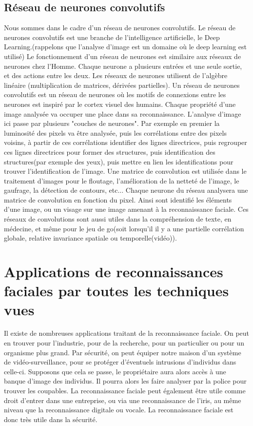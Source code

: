 \documentclass[12pt,french]{article}
\theoremstyle{plain}
\theoremstyle{definition}
\begin{document}
\subsection{Réseau de neurones convolutifs}
Nous sommes dans le cadre d'un réseau de neurones convolutifs. Le réseau de neurones convolutifs est une branche de l'intelligence artificielle, le Deep Learning.(rappelons que l'analyse d'image est un domaine où le deep learning est utilisé) Le fonctionnement d'un réseau de neurones est similaire aux réseaux de neurones chez l'Homme. Chaque neurone a plusieurs entrées et une seule sortie, et des actions entre les deux. Les réseaux de neurones utilisent de l'algèbre linéaire (multiplication de matrices, dérivées partielles). Un réseau de neurones convolutifs est un réseau de neurones où les motifs de connexions entre les neurones est inspiré par le cortex visuel des humains. Chaque propriété d'une image analysée va occuper une place dans sa reconnaissance. L'analyse d'image ici passe par plusieurs "couches de neurones". Par exemple en premier la luminosité des pixels va être analysée, puis les corrélations entre des pixels voisins, à partir de ces corrélations identifier des lignes directrices, puis regrouper ces lignes directrices pour former des structures, puis identification des structures(par exemple des yeux), puis mettre en lien les identifications pour trouver l'identification de l'image.
Une matrice de convolution est utilisée dans le traitement d'images pour le floutage, l'amélioration de la netteté de l'image, le gaufrage, la détection de contours, etc...
Chaque neurone du réseau analysera une matrice de convolution en fonction du pixel. 
Ainsi sont identifié les éléments d'une image, ou un visage sur une image amenant à la reconnaissance faciale.
Ces réseaux de convolutions sont aussi utiles dans la compréhension de texte, en médecine, et même pour le jeu de go(soit lorsqu'il il y a une partielle corrélation globale, relative invariance spatiale ou temporelle(vidéo)).

\newpage
\section{Applications de reconnaissances faciales par toutes les techniques vues}
Il existe de nombreuses applications traitant de la reconnaissance faciale. On peut en trouver pour l'industrie, pour de la recherche, pour un particulier ou pour un organisme plus grand.
Par sécurité, on peut équiper notre maison d'un système de vidéo-surveillance, pour se protéger d'éventuels intrusions d'individus dans celle-ci. 
Supposons que cela se passe, le propriétaire aura alors accès à une banque d'image des individus. Il pourra alors les faire analyser par la police pour trouver les coupables. 
La reconnaissance faciale peut également être utile comme droit d'entrer dans une entreprise, ou via une reconnaissance de l'iris, au même niveau que la reconnaissance digitale ou vocale.
La reconnaissance faciale est donc très utile dans la sécurité.   
\end{document}
